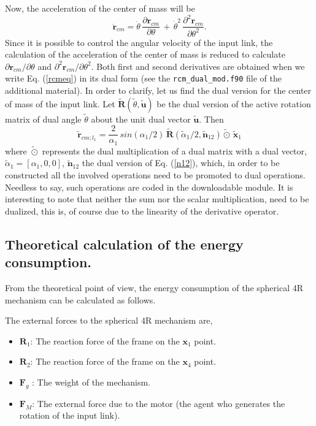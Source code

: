 \documentclass[11pt]{article}
\begin{document}
Now, the acceleration of the center of mass will be
\begin{equation}\label{rcmdt2}
\mathbf{\ddot{r}}_{cm} = \ddot{\theta}\,\frac{\partial \mathbf{r}_{cm}}
{\partial \theta}\, + \,\dot{\theta}^2\,\frac{\partial^2\mathbf{r}_{cm}}
{\partial \theta^2}.
\end{equation}
Since it is possible to control the angular velocity of the input link, 
the calculation of the acceleration of the center of mass is reduced to 
calculate $\partial \mathbf{r}_{cm}/\partial \theta$ and 
$\partial^2\mathbf{r}_{cm}/\partial \theta^2$. Both first and second 
derivatives are obtained when we write Eq. (\ref{rcmeq}) in its dual 
form (see the \verb+rcm_dual_mod.f90+ file of the additional material).
In order to clarify, let us find the dual version for the center of mass
of the input link. Let $\widetilde{\mathbf{R}}(\tilde{\theta},
\tilde{\mathbf{u}})$ be the dual version of the
active rotation matrix of dual angle $\tilde{\theta}$ about the unit 
dual vector $\tilde{\mathbf{u}}$.
Then
\begin{equation}
 \tilde{\mathbf{r}}_{cm;l_1} = \frac{2}{\alpha_1}\,sin(\alpha_1/2)\,
 \widetilde{\mathbf{R}}
 (\tilde{\alpha}_1/2, \tilde{\mathbf{n}}_{12})\tilde{\odot}\, 
 \tilde{\mathbf{x}}_1
\end{equation}
where  $\tilde{\odot}$ represents the dual multiplication of a dual 
matrix with a dual vector, $\tilde{\alpha}_1=[\alpha_1,0,0]$, 
$\tilde{\mathbf{n}}_{12}$ the dual version of Eq. (\ref{n12}), which,
in order to be constructed all the involved operations need to be 
promoted to dual operations. Needless to say, such operations are coded in 
the downloadable module. It is interesting to note that neither the sum 
nor the scalar multiplication, need to be dualized, this is, of course 
due to the linearity of the derivative operator.

\subsection{Theoretical calculation of the energy consumption.}
From the theoretical point of view, the energy consumption of the
spherical 4R mechanism can be calculated as follows.

The external forces to the spherical 4R mechanism are,
\begin{itemize}
\item
$\mathbf{R}_1$: The reaction force of the frame on the $\mathbf{x}_1$ 
point.

\item
$\mathbf{R}_2$: The reaction force of the frame on the $\mathbf{x}_4$ 
point.

\item
$\mathbf{F}_g$ : The weight of the mechanism.

\item
$\mathbf{F}_{M}$: The external force due to the motor (the agent who 
generates the rotation of the input link).
\end{itemize}
\end{document}

